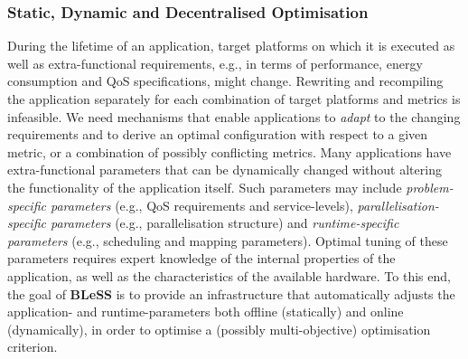 \documentclass[a4paper,11pt]{article}
\newcommand{\project}[1]{\textbf{#1}\xspace}
\newcommand{\BLESS}{\project{BLeSS}}
\newcommand{\TheProject}{\BLESS}
\begin{document}
\subsubsection{Static, Dynamic and Decentralised Optimisation}
\label{sect:optimisation}

During the lifetime of an application, target platforms on which it is executed as well as extra-functional requirements, e.g., in terms of performance, energy consumption and QoS specifications, might change. Rewriting and recompiling the application separately for each
combination of target platforms and metrics is infeasible. We need mechanisms that enable applications to \emph{adapt} to the changing requirements and to derive an optimal configuration with respect to a given metric, or a combination of possibly 
conflicting metrics. Many applications have extra-functional parameters that can be dynamically changed without altering the functionality of the application itself. Such parameters may include \emph{problem-specific parameters} (e.g., QoS requirements and service-levels), \emph{parallelisation-specific parameters} (e.g., parallelisation structure) and \emph{runtime-specific parameters} (e.g., scheduling and mapping parameters). Optimal tuning of these parameters requires expert knowledge of the internal properties of the application, as well as the characteristics of the available hardware. 
To this end, the goal of \TheProject is to provide an infrastructure that automatically 
adjusts the application- and runtime-parameters both offline (statically) and online (dynamically), in order to optimise a (possibly multi-objective) optimisation criterion. 

\end{document}
